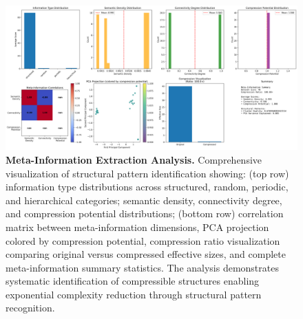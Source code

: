 \begin{figure}[htbp]
\centering
\includegraphics[width=\textwidth]{images/meta_information_extraction_demo.png}
\caption{\textbf{Meta-Information Extraction Analysis.} Comprehensive visualization of structural pattern identification showing: (top row) information type distributions across structured, random, periodic, and hierarchical categories; semantic density, connectivity degree, and compression potential distributions; (bottom row) correlation matrix between meta-information dimensions, PCA projection colored by compression potential, compression ratio visualization comparing original versus compressed effective sizes, and complete meta-information summary statistics. The analysis demonstrates systematic identification of compressible structures enabling exponential complexity reduction through structural pattern recognition.}
\label{fig:meta-information-extraction}
\end{figure}
